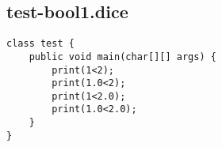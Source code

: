 \subsection{test-bool1.dice}
\begin{verbatim}
class test {
	public void main(char[][] args) {
		print(1<2);
		print(1.0<2);
		print(1<2.0);
		print(1.0<2.0);
	}
}
\end{verbatim}